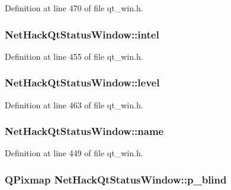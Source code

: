 Definition at line 470 of file qt\+\_\+win.\+h.

\hypertarget{classNetHackQtStatusWindow_acefe133089f27a53bfe3bb5582b2e85e}{
\subsubsection[{intel}]{ Net\+Hack\+Qt\+Status\+Window\+::intel\hspace{0.3cm}{\ttfamily [private]}}}\label{classNetHackQtStatusWindow_acefe133089f27a53bfe3bb5582b2e85e}


Definition at line 455 of file qt\+\_\+win.\+h.

\hypertarget{classNetHackQtStatusWindow_a805f49339c6cf11b278cd1c4bb81c183}{
\subsubsection[{level}]{ Net\+Hack\+Qt\+Status\+Window\+::level\hspace{0.3cm}{\ttfamily [private]}}}\label{classNetHackQtStatusWindow_a805f49339c6cf11b278cd1c4bb81c183}


Definition at line 463 of file qt\+\_\+win.\+h.

\hypertarget{classNetHackQtStatusWindow_a5c1c8e37e5ac595e918ff41d919e2fea}{
\subsubsection[{name}]{ Net\+Hack\+Qt\+Status\+Window\+::name\hspace{0.3cm}{\ttfamily [private]}}}\label{classNetHackQtStatusWindow_a5c1c8e37e5ac595e918ff41d919e2fea}


Definition at line 449 of file qt\+\_\+win.\+h.

\hypertarget{classNetHackQtStatusWindow_ab22890e43586c1762a8944a76c7018cf}{
\subsubsection[{p\+\_\+blind}]{\setlength{\rightskip}{0pt plus 5cm}Q\+Pixmap Net\+Hack\+Qt\+Status\+Window\+::p\+\_\+blind\hspace{0.3cm}{\ttfamily [private]}}}\label{classNetHackQtStatusWindow_ab22890e43586c1762a8944a76c7018cf}


